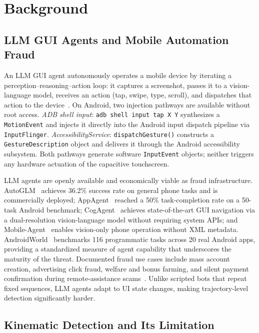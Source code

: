 \section{Background}
\label{sec:background}

\subsection{LLM GUI Agents and Mobile Automation Fraud}
\label{sec:bg_agents}

An LLM GUI agent autonomously operates a mobile device by iterating a perception--reasoning--action
loop: it captures a screenshot, passes it to a vision-language model, receives an action
(tap, swipe, type, scroll), and dispatches that action to the device~\cite{appagent2024,autoglm2024}.%
On Android, two injection pathways are available without root access.%
\textit{ADB shell input}: \texttt{adb shell input tap X Y} synthesizes a \texttt{MotionEvent}
and injects it directly into the Android input dispatch pipeline via \texttt{InputFlinger}.%
\textit{AccessibilityService}: \texttt{dispatchGesture()} constructs a
\texttt{GestureDescription} object and delivers it through the Android accessibility subsystem.%
Both pathways generate software \texttt{InputEvent} objects; neither triggers any hardware
actuation of the capacitive touchscreen.%

LLM agents are openly available and economically viable as fraud infrastructure.%
AutoGLM~\cite{autoglm2024} achieves 36.2\% success rate on general phone tasks and is
commercially deployed; AppAgent~\cite{appagent2024} reached a 50\% task-completion rate
on a 50-task Android benchmark; CogAgent~\cite{cogagent2024} achieves state-of-the-art
GUI navigation via a dual-resolution vision-language model without requiring system APIs;
and Mobile-Agent~\cite{mobileagent2024} enables vision-only phone operation without XML
metadata.%
AndroidWorld~\cite{androidworld2024} benchmarks 116 programmatic tasks across 20 real
Android apps, providing a standardized measure of agent capability that underscores the
maturity of the threat.%
Documented fraud use cases include mass account creation, advertising click fraud,
welfare and bonus farming, and silent payment confirmation during remote-assistance
scams~\cite{clickfraud2021,adffraud2021}.%
Unlike scripted bots that repeat fixed sequences, LLM agents adapt to UI state changes,
making trajectory-level detection significantly harder.%

\subsection{Kinematic Detection and Its Limitation}
\label{sec:bg_kinematic}


